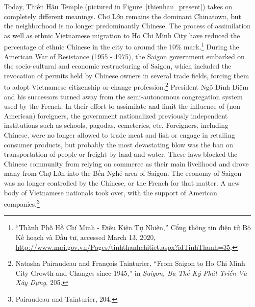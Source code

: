 \vi Today, Thiên Hậu Temple (pictured in Figure~\ref{thienhau_present}) takes on completely different meanings. Chợ Lớn remains the dominant Chinatown, but the neighborhood is no longer predominantly Chinese. The process of assimilation as well as ethnic Vietnamese migration to Ho Chi Minh City have reduced the percentage of ethnic Chinese in the city to around the 10\% mark.\footnote{“Thành Phố Hồ Chí Minh - Điều Kiện Tự Nhiên,” Cổng thông tin điện tử Bộ Kế hoạch và Đầu tư, accessed March 13, 2020, \url{http://www.mpi.gov.vn/Pages/tinhthanhchitiet.aspx?idTinhThanh=35}.} During the American War of Resistance (1955 - 1975), the Saigon government embarked on the socio-cultural and economic restructuring of Saigon, which included the revocation of permits held by Chinese owners in several trade fields, forcing them to adopt  Vietnamese citizenship or change profession.\footnote{Natasha Pairaudeau and François Tainturier, “From Saigon to Ho Chi Minh City Growth and Changes since 1945,” in \textit{Saigon, Ba Thế Kỷ Phát Triển Và Xây Dựng}, 205.} President Ngô Đình Diệm and his successors turned away from the semi-autonomous congregation system used by the French. In their effort to assimilate and limit the influence of (non-American) foreigners, the government nationalized previously independent institutions such as schools, pagodas, cemeteries, etc.  Foreigners, including Chinese, were no longer allowed to trade meat and fish or engage in retailing consumer products, but probably the most devastating blow was the ban on transportation of people or freight by land and water. These laws blocked the Chinese community from relying on commerce as their main livelihood and drove many from Chợ Lớn into the Bến Nghé area of Saigon. The economy of Saigon was no longer controlled by the Chinese, or the French for that matter. A new body of Vietnamese nationals took over, with the support of American companies.\footnote{Pairaudeau and Tainturier, 204.}

